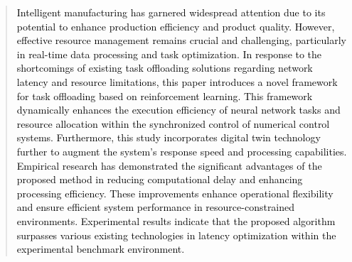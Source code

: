\documentclass[preprint,12pt]{elsarticle}
\begin{document}
\begin{frontmatter}










\begin{abstract}
\textcolor{black}{Intelligent manufacturing has garnered widespread attention due to its potential to enhance production efficiency and product quality. However, effective resource management remains crucial and challenging, particularly in real-time data processing and task optimization. In response to the shortcomings of existing task offloading solutions regarding network latency and resource limitations, this paper introduces a novel framework for task offloading based on reinforcement learning. This framework dynamically enhances the execution efficiency of neural network tasks and resource allocation within the synchronized control of numerical control systems. Furthermore, this study incorporates digital twin technology further to augment the system's response speed and processing capabilities. Empirical research has demonstrated the significant advantages of the proposed method in reducing computational delay and enhancing processing efficiency. These improvements enhance operational flexibility and ensure efficient system performance in resource-constrained environments. Experimental results indicate that the proposed algorithm surpasses various existing technologies in latency optimization within the experimental benchmark environment.}


\end{abstract}
\end{frontmatter}
\end{document}
